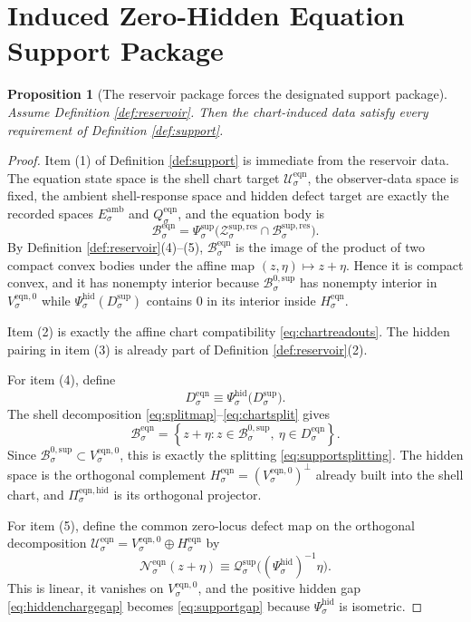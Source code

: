 \documentclass[11pt]{article}
\newcommand{\AmbientTarget}[1]{E_{#1}^{\mathrm{amb}}}
\newcommand{\EqnSpace}[1]{\mathcal U_{#1}^{\mathrm{eqn}}}
\newcommand{\EqnBody}[1]{\mathcal B_{#1}^{\mathrm{eqn}}}
\newcommand{\EqnTarget}[1]{Q_{#1}^{\mathrm{eqn}}}
\newcommand{\EqnZero}[1]{V_{#1}^{\mathrm{eqn},0}}
\newcommand{\EqnHidden}[1]{H_{#1}^{\mathrm{eqn}}}
\newcommand{\EqnHiddenBody}[1]{D_{#1}^{\mathrm{eqn}}}
\newcommand{\EqnProj}[1]{\Pi_{#1}^{\mathrm{eqn,hid}}}
\newcommand{\EqnLin}[1]{\mathcal N_{#1}^{\mathrm{eqn}}}
\newcommand{\ResBody}[1]{\mathcal B_{#1}^{\mathrm{sup,res}}}
\newcommand{\ResShellSet}[1]{\mathcal Z_{#1}^{\mathrm{sup,res}}}
\newcommand{\SeedHiddenBody}[1]{D_{#1}^{\mathrm{sup}}}
\newcommand{\ShellChart}[1]{\Psi_{#1}^{\mathrm{sup}}}
\newcommand{\HiddenChart}[1]{\Psi_{#1}^{\mathrm{hid}}}
\newcommand{\ZeroBody}[1]{\mathcal B_{#1}^{0,\mathrm{sup}}}
\newcommand{\HiddenCharge}[1]{\mathcal Q_{#1}^{\mathrm{sup}}}
\newtheorem{proposition}{Proposition}
\begin{document}
\section{Induced Zero-Hidden Equation Support Package}

\begin{proposition}[The reservoir package forces the designated support package]
\label{prop:support}
Assume Definition \ref{def:reservoir}. Then the chart-induced data satisfy every requirement of Definition \ref{def:support}.
\end{proposition}

\begin{proof}
Item (1) of Definition \ref{def:support} is immediate from the reservoir data. The equation state space is the shell chart target \(\EqnSpace{\sigma}\), the observer-data space is fixed, the ambient shell-response space and hidden defect target are exactly the recorded spaces \(\AmbientTarget{\sigma}\) and \(\EqnTarget{\sigma}\), and the equation body is
\[
\EqnBody{\sigma}
=
\ShellChart{\sigma}\bigl(\ResShellSet{\sigma}\cap\ResBody{\sigma}\bigr).
\]
By Definition \ref{def:reservoir}(4)--(5), \(\EqnBody{\sigma}\) is the image of the product of two compact convex bodies under the affine map \((z,\eta)\mapsto z+\eta\). Hence it is compact convex, and it has nonempty interior because \(\ZeroBody{\sigma}\) has nonempty interior in \(\EqnZero{\sigma}\) while \(\HiddenChart{\sigma}(\SeedHiddenBody{\sigma})\) contains \(0\) in its interior inside \(\EqnHidden{\sigma}\).

Item (2) is exactly the affine chart compatibility \eqref{eq:chartreadouts}. The hidden pairing in item (3) is already part of Definition \ref{def:reservoir}(2).

For item (4), define
\[
\EqnHiddenBody{\sigma}
\equiv
\HiddenChart{\sigma}\bigl(\SeedHiddenBody{\sigma}\bigr).
\]
The shell decomposition \eqref{eq:splitmap}--\eqref{eq:chartsplit} gives
\[
\EqnBody{\sigma}
=
\left\{
z+\eta:
z\in\ZeroBody{\sigma},
\ \eta\in\EqnHiddenBody{\sigma}
\right\}.
\]
Since \(\ZeroBody{\sigma}\subset\EqnZero{\sigma}\), this is exactly the splitting \eqref{eq:supportsplitting}. The hidden space is the orthogonal complement \(\EqnHidden{\sigma}=(\EqnZero{\sigma})^{\perp}\) already built into the shell chart, and \(\EqnProj{\sigma}\) is its orthogonal projector.

For item (5), define the common zero-locus defect map on the orthogonal decomposition \(\EqnSpace{\sigma}=\EqnZero{\sigma}\oplus\EqnHidden{\sigma}\) by
\begin{equation}
\EqnLin{\sigma}(z+\eta)
\equiv
\HiddenCharge{\sigma}\bigl((\HiddenChart{\sigma})^{-1}\eta\bigr).
\label{eq:inducedlin}
\end{equation}
This is linear, it vanishes on \(\EqnZero{\sigma}\), and the positive hidden gap \eqref{eq:hiddenchargegap} becomes \eqref{eq:supportgap} because \(\HiddenChart{\sigma}\) is isometric.


\end{proof}
\end{document}
